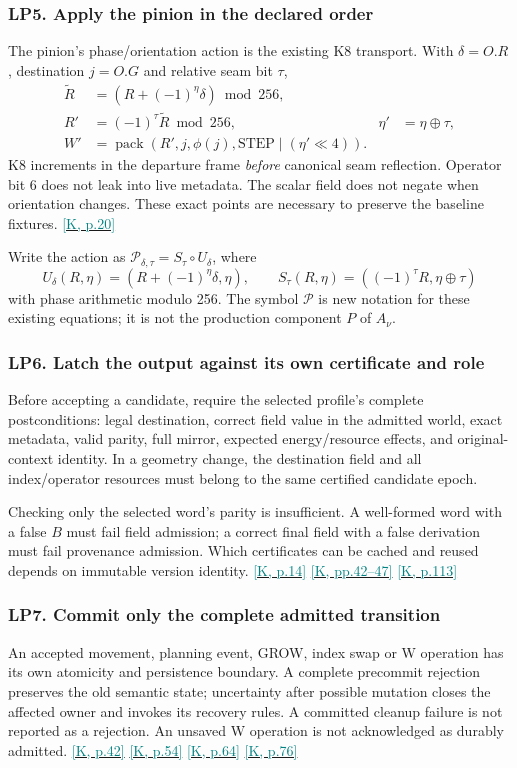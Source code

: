 \documentclass[11pt,a4paper]{article}
\newcommand{\kref}[1]{\hyperlink{baseline.#1}{\textcolor{teal}{[K, p.#1]}}}
\newcommand{\krange}[2]{\hyperlink{baseline.#1}{\textcolor{teal}{[K, pp.#1--#2]}}}
\newcommand{\req}[2]{\subsubsection{#1. #2}}
\theoremstyle{lpstyle}
\newcommand{\LP}{\mathcal P}
\newcommand{\sbit}[1]{(-1)^{#1}}
\begin{document}
\req{LP5}{Apply the pinion in the declared order}
The pinion's phase/orientation action is the existing K8 transport. With $\delta=O.R$, destination $j=O.G$ and relative seam bit $\tau$,
\begin{align}
\widetilde R&=(R+\sbit{\eta}\delta)\bmod256,\label{eq:depart}\\
R'&=\sbit{\tau}\widetilde R\bmod256,
&\eta'&=\eta\oplus\tau,\label{eq:seam}\\
W'&=\operatorname{pack}(R',j,\phi(j),\mathrm{STEP}\mid(\eta'\ll4)).\label{eq:repack}
\end{align}
K8 increments in the departure frame \emph{before} canonical seam reflection. Operator bit 6 does not leak into live metadata. The scalar field does not negate when orientation changes. These exact points are necessary to preserve the baseline fixtures. \kref{20}

Write the action as $\LP_{\delta,\tau}=S_\tau\circ U_\delta$, where
\[
U_\delta(R,\eta)=(R+\sbit{\eta}\delta,\eta),\qquad
S_\tau(R,\eta)=(\sbit{\tau}R,\eta\oplus\tau)
\]
with phase arithmetic modulo 256. The symbol $\LP$ is new notation for these existing equations; it is not the production component $P$ of $A_\nu$.

\req{LP6}{Latch the output against its own certificate and role}
Before accepting a candidate, require the selected profile's complete postconditions: legal destination, correct field value in the admitted world, exact metadata, valid parity, full mirror, expected energy/resource effects, and original-context identity. In a geometry change, the destination field and all index/operator resources must belong to the same certified candidate epoch.

Checking only the selected word's parity is insufficient. A well-formed word with a false $B$ must fail field admission; a correct final field with a false derivation must fail provenance admission. Which certificates can be cached and reused depends on immutable version identity. \kref{14} \krange{42}{47} \kref{113}

\req{LP7}{Commit only the complete admitted transition}
An accepted movement, planning event, GROW, index swap or W operation has its own atomicity and persistence boundary. A complete precommit rejection preserves the old semantic state; uncertainty after possible mutation closes the affected owner and invokes its recovery rules. A committed cleanup failure is not reported as a rejection. An unsaved W operation is not acknowledged as durably admitted. \kref{42} \kref{54} \kref{64} \kref{76}
\end{document}
